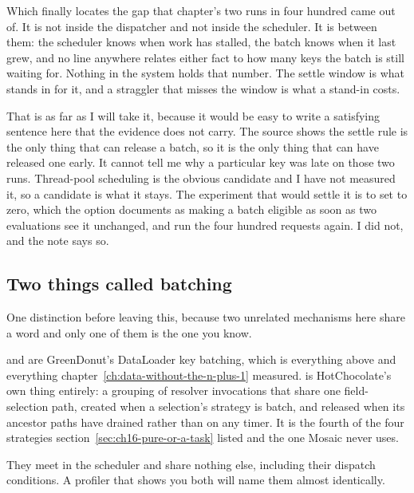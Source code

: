 %
Which finally locates the gap that chapter's two runs in four hundred came out
of. It is not inside the dispatcher and not inside the scheduler. It is between
them: the scheduler knows when work has stalled, the batch knows when it last
grew, and no line anywhere relates either fact to how many keys the batch is
still waiting for. Nothing in the system holds that number. The settle window is
what stands in for it, and a straggler that misses the window is what a stand-in
costs.

%
That is as far as I will take it, because it would be easy to write a satisfying
sentence here that the evidence does not carry. The source shows the settle rule
is the only thing that can release a batch, so it is the only thing that can
have released one early. It cannot tell me why a particular key was late on
those two runs. Thread-pool scheduling is the obvious candidate and I have not
measured it, so a candidate is what it stays. The experiment that would settle
it is to set  to zero, which the option documents as
making a batch eligible as soon as two evaluations see it unchanged, and run the
four hundred requests again. I did not, and the note says so.

\subsection*{Two things called batching}

%
One distinction before leaving this, because two unrelated mechanisms here share
a word and only one of them is the one you know.

 and  are GreenDonut's DataLoader key
batching, which is everything above and everything
chapter~\ref{ch:data-without-the-n-plus-1} measured.
 is HotChocolate's own thing entirely: a grouping of
resolver invocations that share one field-selection path, created when a
selection's strategy is batch, and released when its ancestor paths have
drained rather than on any timer. It is the fourth of the four strategies
section~\ref{sec:ch16-pure-or-a-task} listed and the one Mosaic never uses.

They meet in the scheduler and share nothing else, including their dispatch
conditions. A profiler that shows you both will name them almost identically.

